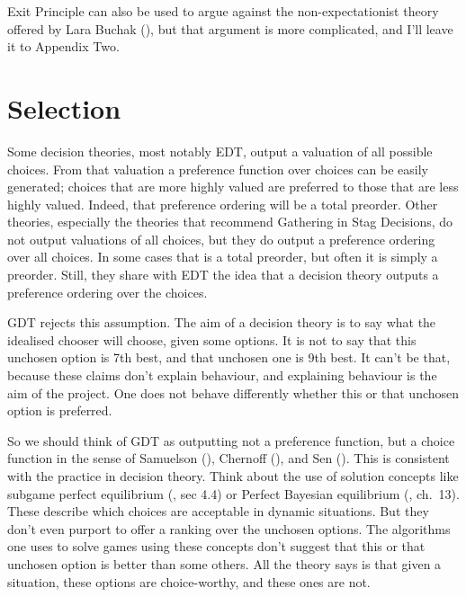 \documentclass[
  12pt,
  letterpaper,
  DIV=11,
  numbers=noendperiod]{scrreprt}
\begin{document}
Exit Principle can also be used to argue against the non-expectationist
theory offered by Lara Buchak (), but
that argument is more complicated, and I'll leave it to Appendix Two.


\chapter{Selection}\label{sec-select}

Some decision theories, most notably EDT, output a valuation of all
possible choices. From that valuation a preference function over choices
can be easily generated; choices that are more highly valued are
preferred to those that are less highly valued. Indeed, that preference
ordering will be a total preorder. Other theories, especially the
theories that recommend Gathering in Stag Decisions, do not output
valuations of all choices, but they do output a preference ordering over
all choices. In some cases that is a total preorder, but often it is
simply a preorder. Still, they share with EDT the idea that a decision
theory outputs a preference ordering over the choices.

GDT rejects this assumption. The aim of a decision theory is to say what
the idealised chooser will choose, given some options. It is not to say
that this unchosen option is 7th best, and that unchosen one is 9th
best. It can't be that, because these claims don't explain behaviour,
and explaining behaviour is the aim of the project. One does not behave
differently whether this or that unchosen option is preferred.

So we should think of GDT as outputting not a preference function, but a
choice function in the sense of Samuelson
(), Chernoff
(), and Sen
(). This is consistent with the practice in
decision theory. Think about the use of solution concepts like subgame
perfect equilibrium (, sec 4.4)
or Perfect Bayesian equilibrium (, ch.~13). These describe which choices are acceptable in dynamic
situations. But they don't even purport to offer a ranking over the
unchosen options. The algorithms one uses to solve games using these
concepts don't suggest that this or that unchosen option is better than
some others. All the theory says is that given a situation, these
options are choice-worthy, and these ones are not.
\end{document}
